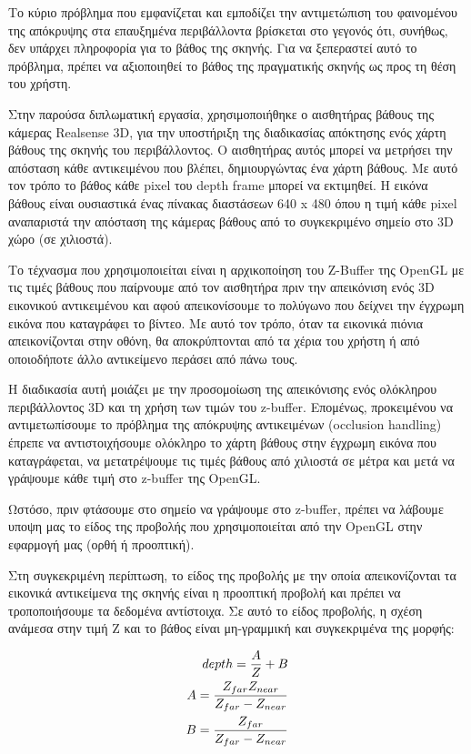 Το κύριο πρόβλημα που εμφανίζεται και εμποδίζει την αντιμετώπιση του φαινομένου της απόκρυψης στα επαυξημένα περιβάλλοντα βρίσκεται στο γεγονός ότι, συνήθως, δεν υπάρχει πληροφορία για το βάθος της σκηνής. Για να ξεπεραστεί αυτό το πρόβλημα, πρέπει να αξιοποιηθεί το βάθος της πραγματικής σκηνής ως προς τη θέση του χρήστη. 

Στην παρούσα διπλωματική εργασία, χρησιμοποιήθηκε ο αισθητήρας βάθους της κάμερας Realsense 3D, για την υποστήριξη της διαδικασίας απόκτησης ενός χάρτη βάθους της σκηνής του περιβάλλοντος. O αισθητήρας αυτός μπορεί να μετρήσει την απόσταση κάθε αντικειμένου που βλέπει, δημιουργώντας ένα χάρτη βάθους. Με αυτό τον τρόπο το βάθος κάθε pixel του depth frame μπορεί να εκτιμηθεί. Η εικόνα βάθους είναι ουσιαστικά ένας πίνακας διαστάσεων 640 x 480  όπου η τιμή κάθε pixel αναπαριστά την απόσταση της κάμερας βάθους από το συγκεκριμένο σημείο στο 3D χώρο (σε χιλιοστά). 



Το τέχνασμα που χρησιμοποιείται είναι η αρχικοποίηση του Z-Buffer της OpenGL με τις τιμές βάθους που παίρνουμε από τον αισθητήρα πριν την απεικόνιση ενός 3D εικονικού αντικειμένου και αφού απεικονίσουμε το πολύγωνο που δείχνει την έγχρωμη εικόνα που καταγράφει το βίντεο. Με αυτό τον τρόπο, όταν τα εικονικά πιόνια απεικονίζονται στην οθόνη, θα αποκρύπτονται από τα χέρια του χρήστη ή από οποιοδήποτε άλλο αντικείμενο περάσει από πάνω τους. 

Η διαδικασία αυτή μοιάζει με την προσομοίωση της απεικόνισης ενός ολόκληρου περιβάλλοντος 3D και τη χρήση των τιμών του z-buffer. Eπομένως, προκειμένου να αντιμετωπίσουμε το πρόβλημα της απόκρυψης αντικειμένων (occlusion handling) έπρεπε να αντιστοιχήσουμε ολόκληρο το χάρτη βάθους στην έγχρωμη εικόνα που καταγράφεται, να μετατρέψουμε τις τιμές βάθους από χιλιοστά σε μέτρα και μετά να γράψουμε κάθε τιμή στο z-buffer της OpenGL.


Ωστόσο, πριν φτάσουμε στο σημείο να γράψουμε στο z-buffer, πρέπει να λάβουμε υποψη μας το είδος της προβολής που χρησιμοποιείται από την OpenGL στην εφαρμογή μας (ορθή ή προοπτική). 


Στη συγκεκριμένη περίπτωση, το είδος της προβολής με την οποία απεικονίζονται τα εικονικά αντικείμενα της σκηνής είναι η προοπτική προβολή και πρέπει να τροποποιήσουμε τα δεδομένα αντίστοιχα. Σε αυτό το είδος προβολής, η σχέση ανάμεσα στην τιμή Z και το βάθος είναι μη-γραμμική και συγκεκριμένα της μορφής:



\begin{equation}
\begin{aligned}
depth=\frac{A}{Z}+B \\ \vspace{0.2cm}
A=\frac{Z_{far}Z_{near}}{Z_{far}-Z_{near}}\\ \vspace{0.2cm}
B=\frac{Z_{far}}{Z_{far}-Z_{near}}
\end{aligned}
\end{equation}

